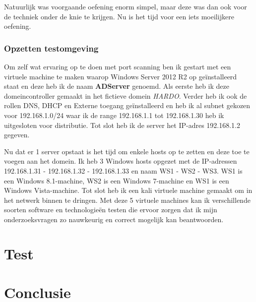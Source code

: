 \documentclass[pdftex,a4paper,12pt]{report}
\begin{document}
Natuurlijk was voorgaande oefening enorm simpel, maar deze was dan ook voor de techniek onder de knie te krijgen. Nu is het tijd voor een iets moeilijkere oefening.

\subsection{Opzetten testomgeving}
Om zelf wat ervaring op te doen met port scanning ben ik gestart met een virtuele machine te maken waarop Windows Server 2012 R2 op geïnstalleerd staat en deze heb ik de naam \textbf{ADServer} genoemd. Als eerste heb ik deze domeincontroller gemaakt in het fictieve domein \textit{HARDO}. Verder heb ik ook de rollen DNS, DHCP en Externe toegang geïnstalleerd en heb ik al subnet gekozen voor 192.168.1.0/24 waar ik de range 192.168.1.1 tot 192.168.1.30 heb ik uitgesloten voor distributie. Tot slot heb ik de server het IP-adres 192.168.1.2 gegeven. \newline

Nu dat er 1 server opstaat is het tijd om enkele hosts op te zetten en deze toe te voegen aan het domein. Ik heb 3 Windows hosts opgezet met de IP-adressen 192.168.1.31 - 192.168.1.32 - 192.168.1.33 en naam WS1 - WS2 - WS3. WS1 is een Windows 8.1-machine, WS2 is een Windows 7-machine en WS1 is een Windows Vista-machine. Tot slot heb ik een kali virtuele machine gemaakt om in het netwerk binnen te dringen. Met deze 5 virtuele machines kan ik verschillende soorten software en technologieën testen die ervoor zorgen dat ik mijn onderzoeksvragen zo nauwkeurig en correct mogelijk kan beantwoorden. 

\subsection{}
\chapter{Test}




\chapter{Conclusie}
\label{ch:conclusie}

\lipsum[76-80]






\listoffigures
\listoftables
\end{document}
